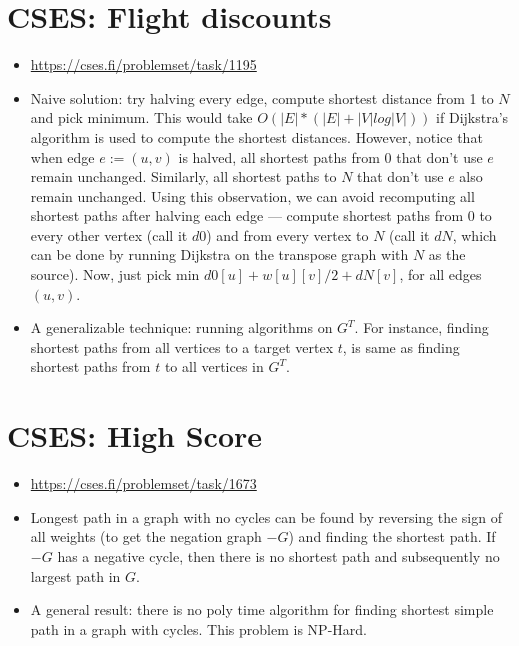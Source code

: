 \documentclass[titlepage, 12pt]{book}
\begin{document}
\section{CSES: Flight discounts}
\begin{itemize}
  \item \url{https://cses.fi/problemset/task/1195}
  \item Naive solution: try halving every edge, compute shortest distance from 1
    to $N$ and pick minimum. This would take $O(|E| * (|E| + |V|log|V|))$ if
    Dijkstra's algorithm is used to compute the shortest distances. However,
    notice that when edge $e := (u, v)$ is halved, all shortest paths from 0 that
    don't use $e$ remain unchanged. Similarly, all shortest paths to $N$ that
    don't use $e$ also remain unchanged. Using this observation, we can avoid
    recomputing all shortest paths after halving each edge --- compute shortest
    paths from 0 to every other vertex (call it $d0$) and from every vertex to
    $N$ (call it $dN$, which can be done by running Dijkstra on the transpose
    graph with $N$ as the source). Now, just pick min $d0[u] + w[u][v] / 2 +
    dN[v]$, for all edges $(u, v)$.
  \item A generalizable technique: running algorithms on $G^T$. For instance,
    finding shortest paths from all vertices to a target vertex $t$, is same as
    finding shortest paths from $t$ to all vertices in $G^T$.
\end{itemize}

\section{CSES: High Score}
\begin{itemize}
  \item \url{https://cses.fi/problemset/task/1673}
  \item Longest path in a graph with no cycles can be found by reversing the
    sign of all weights (to get the negation graph $-G$) and finding the
    shortest path. If $-G$ has a negative cycle, then there is no shortest path
    and subsequently no largest path in $G$.
  \item A general result: there is no poly time algorithm for finding shortest
    simple path in a graph with cycles. This problem is NP-Hard.
\end{itemize}
\end{document}
